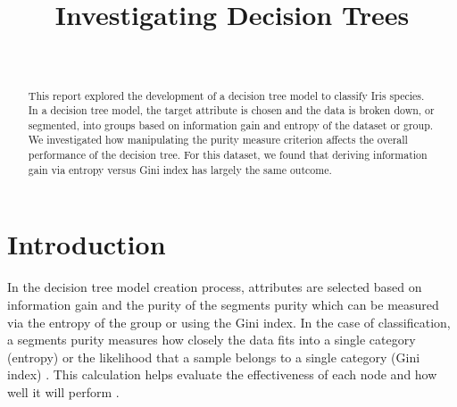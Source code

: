 \documentclass[journal]{IEEEtran}
\begin{document}
\setlength{\emergencystretch}{12pt}
\setlength{\parindent}{10pt}



\lstset{style=mystyle}

\title{Investigating Decision Trees}

\author{
\\
}

\maketitle

\begin{abstract}
\label{log:abstract}
This report explored the development of a decision tree model to classify Iris species. In a decision tree model, the target attribute is chosen and the data is broken down, or segmented, into groups based on information gain and entropy of the dataset or group. We investigated how manipulating the purity measure criterion affects the overall performance of the decision tree. For this dataset, we found that deriving information gain via entropy versus Gini index has largely the same outcome.
\end{abstract}

\section{Introduction}

In the decision tree model creation process, attributes are selected based on information gain and the purity of the segments purity which can be measured via the entropy of the group or using the Gini index. In the case of classification, a segment\textquotesingle s purity measures how closely the data fits into a single category (entropy) or the likelihood that a sample belongs to a single category (Gini index) \cite{b2}. This calculation helps evaluate the effectiveness of each node and how well it will perform \cite{b1}. 
\end{document}
